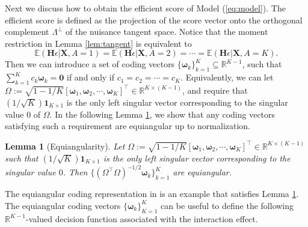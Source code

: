 \documentclass[11pt]{article}
\newtheorem{lem}{Lemma}
\newtheorem{prop}[thm]{Proposition}
\theoremstyle{definition}
\theoremstyle{remark}
\newcommand{\bx}{\bm{x}}
\newcommand{\bH}{\bm{H}}
\newcommand{\bS}{\bm{S}}
\newcommand{\bX}{\bm{X}}
\newcommand{\bbeta}{\bm{\beta}}
\newcommand{\bomega}{\bm{\omega}}
\newcommand{\bbE}{\mathbb{E}}
\newcommand{\bbR}{\mathbb{R}}
\newcommand{\sA}{\mathscr{A}}
\newcommand{\bzero}{\mathbf{0}}	%
\newcommand{\bone}{\mathbf{1}}	%
\newcommand{\eff}{\mathrm{eff}}
\begin{document}
Next we discuss how to obtain the efficient score of Model (\ref{eq:model}). The efficient score is defined as the projection of the score vector onto the orthogonal complement $ \Lambda^{\perp} $ of the nuisance tangent space. 
Notice that the moment restriction in Lemma \ref{lem:tangent} is equivalent to
\[ \bbE(\bH\epsilon|\bX,A=1) = \bbE(\bH\epsilon|\bX,A=2) = \cdots = \bbE(\bH\epsilon|\bX,A=K). \]
Then we can introduce a set of coding vectors $ \{ \bomega_{k} \}_{k=1}^{K} \subseteq \bbR^{K-1} $, such that $ \sum_{k=1}^{K}c_{k}\bomega_{k} = \bzero $ if and only if $ c_{1} = c_{2} = \cdots = c_{K} $. Equivalently, we can let $ \Omega := \sqrt{1-1/K}[\bomega_{1},\bomega_{2},\cdots,\bomega_{K}]^{\intercal} \in \bbR^{K \times (K-1)} $, and require that $ (1/\sqrt{K})\bone_{K\times 1} $ is the only left singular vector corresponding to the singular value $ 0 $ of $ \Omega $. In the following Lemma \ref{lem:equiang}, we show that any coding vectors satisfying such a requirement are equiangular up to normalization.

\begin{lem}[Equiangularity]\label{lem:equiang}
	Let $ \Omega := \sqrt{1-1/K}[\bomega_{1},\bomega_{2},\cdots,\bomega_{K}]^{\intercal} \in \bbR^{K \times (K-1)} $ such that $ (1/\sqrt{K})\bone_{K\times 1} $ is the only left singular vector corresponding to the singular value $ 0 $. Then $ \{ (\Omega^{\intercal}\Omega)^{-1/2}\bomega_{k} \}_{k=1}^{K} $ are equiangular. 
\end{lem}

The equiangular coding representation in \citet{zhang2014multicategory,zhang2020multicategory,qi2020multi} is an example that satisfies Lemma \ref{lem:equiang}. The equiangular coding vectors $ \{ \bomega_{k} \}_{K=1}^{K} $ can be useful to define the following $ \bbR^{K-1} $-valued decision function associated with the interaction effect.
\end{document}
